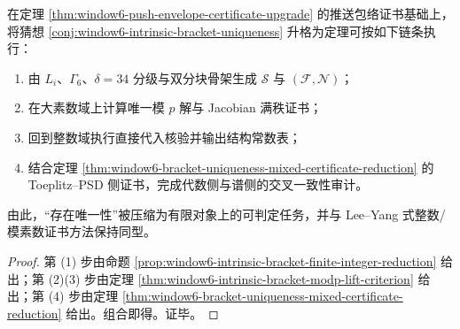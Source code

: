 \begin{corollary}[内禀括号定理化的可执行证书链]\label{cor:window6-intrinsic-bracket-theoremization-pipeline}
在定理 \ref{thm:window6-push-envelope-certificate-upgrade} 的推送包络证书基础上，
将猜想 \ref{conj:window6-intrinsic-bracket-uniqueness} 升格为定理可按如下链条执行：
\begin{enumerate}
  \item 由 \(L_i\)、\(\Gamma_6\)、\(\delta=34\) 分级与双分块骨架生成 \(\mathcal S\) 与 \((\mathcal F,\mathcal N)\)；
  \item 在大素数域上计算唯一模 \(p\) 解与 Jacobian 满秩证书；
  \item 回到整数域执行直接代入核验并输出结构常数表；
  \item 结合定理 \ref{thm:window6-bracket-uniqueness-mixed-certificate-reduction} 的 Toeplitz--PSD 侧证书，完成代数侧与谱侧的交叉一致性审计。
\end{enumerate}
由此，“存在唯一性”被压缩为有限对象上的可判定任务，并与 Lee--Yang 式整数/模素数证书方法保持同型。
\end{corollary}
\begin{proof}
第 (1) 步由命题
\ref{prop:window6-intrinsic-bracket-finite-integer-reduction}
给出；第 (2)(3) 步由定理
\ref{thm:window6-intrinsic-bracket-modp-lift-criterion}
给出；第 (4) 步由定理
\ref{thm:window6-bracket-uniqueness-mixed-certificate-reduction}
给出。组合即得。证毕。
\end{proof}
